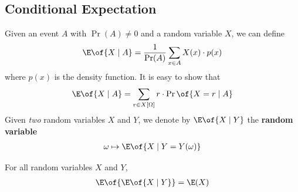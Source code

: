 

\subsection{Conditional Expectation}

Given an event $A$ with $\Pr(A) \neq 0$ and a random variable $X$, we can define
\begin{align*}
    \E\of{X \mid A} = \frac{1}{\Pr(A)} \sum_{x \in A} X(x) \cdot p(x)
\end{align*}
where $p(x)$ is the density function. It is easy to show that
\begin{align*}
    \E\of{X \mid A} = \sum_{r \in X[\Omega]} r \cdot \Pr\of{X = r \mid A}
\end{align*}
Given \textit{two} random variables $X$ and $Y$, we denote by $\E\of{X \mid Y}$ the \textbf{random variable}
\begin{align*}
    \omega \mapsto \E\of{X \mid Y = Y(\omega)}
\end{align*}

\begin{boxtheorem}
    For all random variables $X$ and $Y$,
    \begin{align*}
        \E\of{\E\of{X \mid Y}} = \E(X)
    \end{align*}
\end{boxtheorem}

